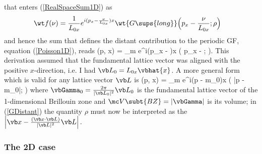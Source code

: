 \documentclass[letterpaper]{article}
\begin{document}
that enters (\ref{RealSpaceSum1D}) as
\begin{align*}
   \wt f(\nu) 
 &= \frac{1}{L_{0x}} e^{i(p_x-\frac{\nu}{L_{0x}}) x}
                   \wt{G\sups{long}}\Big(p_x-\frac{\nu}{L_{0x}}; \rho\Big)
\end{align*}
and hence the sum that defines the distant contribution
to the periodic GF, equation (\ref{Poisson1D}), reads
{
  (\vb p, \vb x) 
  = \sum_{m} e^{i(p_x - )x}
   \Big( p_x - ; \rho\Big).
}
This derivation assumed that the fundamental lattice vector was aligned 
with the positive $x$-direction, i.e. I had $\vb L_0=L_{0x}\vbhat{x}$.
A more general form which is valid for any lattice vector $\vb L$
is 
{
  (\vb p, \vb x)
  =
   \sum_{m} e^{i(\vb p - m\vbGamma_0)\cdot \vb x}
          \Big( \big|\vb p - m\vbGamma_0\big|; \rho\Big)
}
where $\vbGamma_0=\frac{2\pi}{|\vb L_0|^2}\vb L_0$ 
is the fundamental lattice vector of the 1-dimensional
Brillouin zone and 
$\mc V\subt{BZ}=|\vbGamma|$ is its volume; in (\ref{GDistant}) 
the quantity $\rho$ must now be interpreted as the 
$\left| \vb x - \frac{(\vb x \cdot \vb L)}{|\vb L|^2}\vb L\right|.$

\subsubsection{The 2D case}
\end{document}
